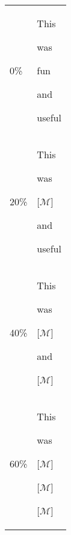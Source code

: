 \documentclass[10pt]{standalone}
\renewcommand*{\strut}{\rule[-0.2\baselineskip]{0pt}{0.9\baselineskip}}
\begin{document}
    \begin{tabular}{p{0.10cm}p{3.5cm}}
    \toprule
     \rowcolor{gray!10} 0\% & %
     \colorbox{rgb,255:red,254; green,228; blue,191}{\strut This}\allowbreak%
     \colorbox{rgb,255:red,254; green,239; blue,217}{\strut was}\allowbreak%
     \colorbox{rgb,255:red,252; green,141; blue,89}{\strut fun}\allowbreak%
     \colorbox{rgb,255:red,255; green,247; blue,237}{\strut and}\allowbreak%
     \colorbox{rgb,255:red,254; green,239; blue,217}{\strut useful} \\
     20\% & %
     \colorbox{rgb,255:red,253; green,191; blue,136}{\strut This}\allowbreak%
     \colorbox{rgb,255:red,254; green,228; blue,191}{\strut was}\allowbreak%
     \colorbox{rgb,255:red,255; green,247; blue,237}{\strut [$\mathcal{M}$]}\allowbreak%
     \colorbox{rgb,255:red,254; green,228; blue,191}{\strut and}\allowbreak%
     \colorbox{rgb,255:red,252; green,141; blue,89}{\strut useful} \\
     \rowcolor{gray!10} 40\% & %
     \colorbox{rgb,255:red,254; green,228; blue,191}{\strut This}\allowbreak%
     \colorbox{rgb,255:red,254; green,239; blue,217}{\strut was}\allowbreak%
     \colorbox{rgb,255:red,255; green,247; blue,237}{\strut [$\mathcal{M}$]}\allowbreak%
     \colorbox{rgb,255:red,253; green,191; blue,136}{\strut and}\allowbreak%
     \colorbox{rgb,255:red,254; green,239; blue,217}{\strut [$\mathcal{M}$]} \\
     60\% & %
     \colorbox{rgb,255:red,253; green,191; blue,136}{\strut This}\allowbreak%
     \colorbox{rgb,255:red,254; green,239; blue,217}{\strut was}\allowbreak%
     \colorbox{rgb,255:red,255; green,247; blue,237}{\strut [$\mathcal{M}$]}\allowbreak%
     \colorbox{rgb,255:red,254; green,228; blue,191}{\strut [$\mathcal{M}$]}\allowbreak%
     \colorbox{rgb,255:red,254; green,239; blue,217}{\strut [$\mathcal{M}$]} \\
     \bottomrule
    \end{tabular}
\end{document}
